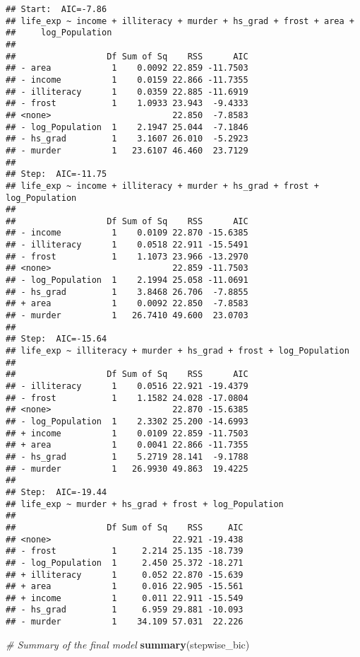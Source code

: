 \documentclass[
]{article}
\newenvironment{Shaded}{\begin{snugshade}}{\end{snugshade}}
\newcommand{\CommentTok}[1]{\textcolor[rgb]{0.56,0.35,0.01}{\textit{#1}}}
\newcommand{\FunctionTok}[1]{\textcolor[rgb]{0.13,0.29,0.53}{\textbf{#1}}}
\newcommand{\NormalTok}[1]{#1}
\begin{document}
\begin{verbatim}
## Start:  AIC=-7.86
## life_exp ~ income + illiteracy + murder + hs_grad + frost + area + 
##     log_Population
## 
##                  Df Sum of Sq    RSS      AIC
## - area            1    0.0092 22.859 -11.7503
## - income          1    0.0159 22.866 -11.7355
## - illiteracy      1    0.0359 22.885 -11.6919
## - frost           1    1.0933 23.943  -9.4333
## <none>                        22.850  -7.8583
## - log_Population  1    2.1947 25.044  -7.1846
## - hs_grad         1    3.1607 26.010  -5.2923
## - murder          1   23.6107 46.460  23.7129
## 
## Step:  AIC=-11.75
## life_exp ~ income + illiteracy + murder + hs_grad + frost + log_Population
## 
##                  Df Sum of Sq    RSS      AIC
## - income          1    0.0109 22.870 -15.6385
## - illiteracy      1    0.0518 22.911 -15.5491
## - frost           1    1.1073 23.966 -13.2970
## <none>                        22.859 -11.7503
## - log_Population  1    2.1994 25.058 -11.0691
## - hs_grad         1    3.8468 26.706  -7.8855
## + area            1    0.0092 22.850  -7.8583
## - murder          1   26.7410 49.600  23.0703
## 
## Step:  AIC=-15.64
## life_exp ~ illiteracy + murder + hs_grad + frost + log_Population
## 
##                  Df Sum of Sq    RSS      AIC
## - illiteracy      1    0.0516 22.921 -19.4379
## - frost           1    1.1582 24.028 -17.0804
## <none>                        22.870 -15.6385
## - log_Population  1    2.3302 25.200 -14.6993
## + income          1    0.0109 22.859 -11.7503
## + area            1    0.0041 22.866 -11.7355
## - hs_grad         1    5.2719 28.141  -9.1788
## - murder          1   26.9930 49.863  19.4225
## 
## Step:  AIC=-19.44
## life_exp ~ murder + hs_grad + frost + log_Population
## 
##                  Df Sum of Sq    RSS     AIC
## <none>                        22.921 -19.438
## - frost           1     2.214 25.135 -18.739
## - log_Population  1     2.450 25.372 -18.271
## + illiteracy      1     0.052 22.870 -15.639
## + area            1     0.016 22.905 -15.561
## + income          1     0.011 22.911 -15.549
## - hs_grad         1     6.959 29.881 -10.093
## - murder          1    34.109 57.031  22.226
\end{verbatim}

\begin{Shaded}
\begin{Highlighting}[]
\CommentTok{\# Summary of the final model}
\FunctionTok{summary}\NormalTok{(stepwise\_bic)}
\end{Highlighting}
\end{Shaded}
\end{document}
